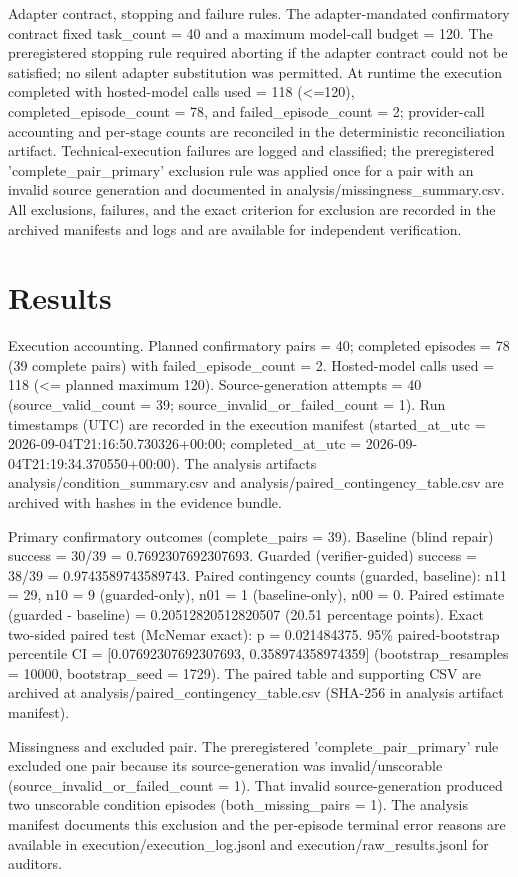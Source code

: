 \documentclass[conference]{IEEEtran}
\begin{document}
Adapter contract, stopping and failure rules. The adapter-mandated confirmatory contract fixed task\_count = 40 and a maximum model-call budget = 120. The preregistered stopping rule required aborting if the adapter contract could not be satisfied; no silent adapter substitution was permitted. At runtime the execution completed with hosted-model calls used = 118 (<=120), completed\_episode\_count = 78, and failed\_episode\_count = 2; provider-call accounting and per-stage counts are reconciled in the deterministic reconciliation artifact. Technical-execution failures are logged and classified; the preregistered 'complete\_pair\_primary' exclusion rule was applied once for a pair with an invalid source generation and documented in analysis/missingness\_summary.csv. All exclusions, failures, and the exact criterion for exclusion are recorded in the archived manifests and logs and are available for independent verification.

\section{Results}
Execution accounting. Planned confirmatory pairs = 40; completed episodes = 78 (39 complete pairs) with failed\_episode\_count = 2. Hosted-model calls used = 118 (<= planned maximum 120). Source-generation attempts = 40 (source\_valid\_count = 39; source\_invalid\_or\_failed\_count = 1). Run timestamps (UTC) are recorded in the execution manifest (started\_at\_utc = 2026-09-04T21:16:50.730326+00:00; completed\_at\_utc = 2026-09-04T21:19:34.370550+00:00). The analysis artifacts analysis/condition\_summary.csv and analysis/paired\_contingency\_table.csv are archived with hashes in the evidence bundle.

Primary confirmatory outcomes (complete\_pairs = 39). Baseline (blind repair) success = 30/39 = 0.7692307692307693. Guarded (verifier-guided) success = 38/39 = 0.9743589743589743. Paired contingency counts (guarded, baseline): n11 = 29, n10 = 9 (guarded-only), n01 = 1 (baseline-only), n00 = 0. Paired estimate (guarded - baseline) = 0.20512820512820507 (20.51 percentage points). Exact two-sided paired test (McNemar exact): p = 0.021484375. 95\% paired-bootstrap percentile CI = [0.07692307692307693, 0.358974358974359] (bootstrap\_resamples = 10000, bootstrap\_seed = 1729). The paired table and supporting CSV are archived at analysis/paired\_contingency\_table.csv (SHA-256 in analysis artifact manifest).

Missingness and excluded pair. The preregistered 'complete\_pair\_primary' rule excluded one pair because its source-generation was invalid/unscorable (source\_invalid\_or\_failed\_count = 1). That invalid source-generation produced two unscorable condition episodes (both\_missing\_pairs = 1). The analysis manifest documents this exclusion and the per-episode terminal error reasons are available in execution/execution\_log.jsonl and execution/raw\_results.jsonl for auditors.
\end{document}
